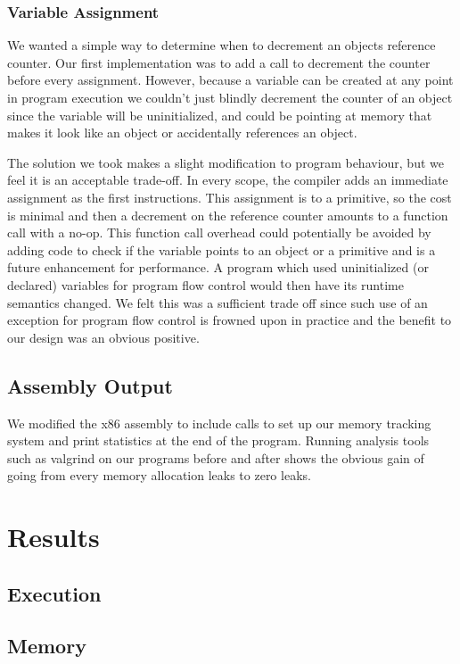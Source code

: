 \documentclass{sigplanconf}
\begin{document}
\subsubsection{Variable Assignment}
We wanted a simple way to determine when to decrement an objects reference counter.  Our first implementation was to add a call to decrement the counter before every assignment.  However, because a variable can be created at any point in program execution we couldn't just blindly decrement the counter of an object since the variable will be uninitialized, and could be pointing at memory that makes it look like an object or accidentally references an object.
\par
The solution we took makes a slight modification to program behaviour, but we feel it is an acceptable trade-off.  In every scope, the compiler adds an immediate assignment as the first instructions.  This assignment is to a primitive, so the cost is minimal and then a decrement on the reference counter amounts to a function call with a no-op.  This function call overhead could potentially be avoided by adding code to check if the variable points to an object or a primitive and is a future enhancement for performance.  A program which used uninitialized (or declared) variables for program flow control would then have its runtime semantics changed.  We felt this was a sufficient trade off since such use of an exception for program flow control is frowned upon in practice and the benefit to our design was an obvious positive.


\subsection{Assembly Output}
We modified the x86 assembly to include calls to set up our memory tracking system and print statistics at the end of the program.  Running analysis tools such as valgrind on our programs before and after shows the obvious gain of going from every memory allocation leaks to zero leaks.
\section{Results}
\subsection{Execution}
\subsection{Memory}
\end{document}
